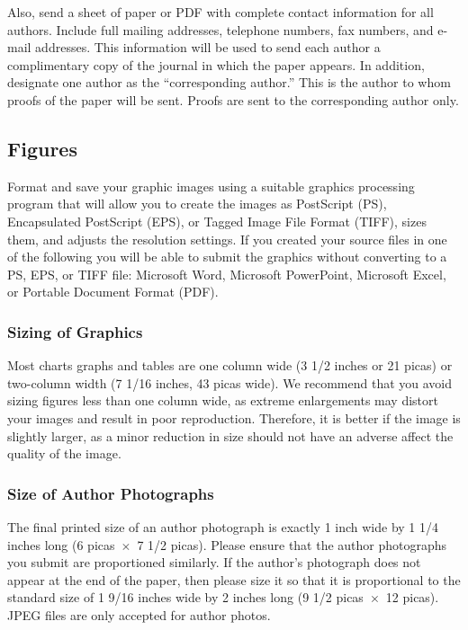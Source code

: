 \documentclass[transmag]{IEEEtran}
\begin{document}
Also, send a sheet of paper or PDF with complete contact information for all 
authors. Include full mailing addresses, telephone numbers, fax numbers, and 
e-mail addresses. This information will be used to send each author a 
complimentary copy of the journal in which the paper appears. In addition, 
designate one author as the ``corresponding author.'' This is the author to 
whom proofs of the paper will be sent. Proofs are sent to the corresponding 
author only.

\subsection{Figures}
Format and save your graphic images using a suitable graphics processing 
program that will allow you to create the images as PostScript (PS), 
Encapsulated PostScript (EPS), or Tagged Image File Format (TIFF), sizes 
them, and adjusts the resolution settings. If you created your source files 
in one of the following you will be able to submit the graphics without 
converting to a PS, EPS, or TIFF file: Microsoft Word, Microsoft PowerPoint, 
Microsoft Excel, or Portable Document Format (PDF). 

\subsubsection*{Sizing of Graphics}

Most charts graphs and tables are one column wide (3 1/2 inches or 21 picas) 
or two-column width (7 1/16 inches, 43 picas wide). We recommend that you 
avoid sizing figures less than one column wide, as extreme enlargements may 
distort your images and result in poor reproduction. Therefore, it is better 
if the image is slightly larger, as a minor reduction in size should not 
have an adverse affect the quality of the image. 

\subsubsection*{Size of Author Photographs}

The final printed size of an author photograph is exactly 
1 inch wide by 1 1/4 inches long (6 picas~$\times$~7 1/2 picas). Please 
ensure that the author photographs you submit are proportioned similarly. If 
the author's photograph does not appear at the end of the paper, then please 
size it so that it is proportional to the standard size of 1 9/16 inches 
wide by 
2 inches long (9 1/2 picas~$\times$~12 picas). JPEG files are only 
accepted for author photos.
\end{document}
